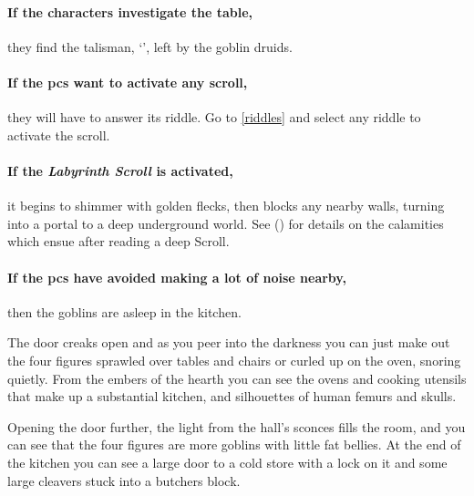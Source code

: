 \begin{multicols}{2}

\paragraph{If the characters investigate the table,}
they find the \gls{talisman}, `\lootMagic', left by the goblin druids.

\showTalisman

\labyrinthScroll

\showTalisman

\paragraph{If the \glspl{pc} want to activate any scroll,}
they will have to answer its riddle.
Go to \autoref{riddles} and select any riddle to activate the scroll.

\paragraph{If the \textit{Labyrinth Scroll} is activated,}
it begins to shimmer with golden flecks, then blocks any nearby walls, turning into a portal to a deep underground world.
See  () for details on the calamities which ensue after reading a \gls{deep} Scroll.


\paragraph{If the \glspl{pc} have avoided making a lot of noise nearby,}
then the goblins are asleep in the kitchen.

\begin{boxtext}

  The door creaks open and as you peer into the darkness you can just make out the four figures sprawled over tables and chairs or curled up on the oven, snoring quietly.
  From the embers of the hearth you can see the ovens and cooking utensils that make up a substantial kitchen, and silhouettes of human femurs and skulls.

  Opening the door further, the light from the hall's sconces fills the room, and you can see that the four figures are more goblins with little fat bellies.
  At the end of the kitchen you can see a large door to a cold store with a lock on it and some large cleavers stuck into a butchers block.


\end{boxtext}
\end{multicols}
